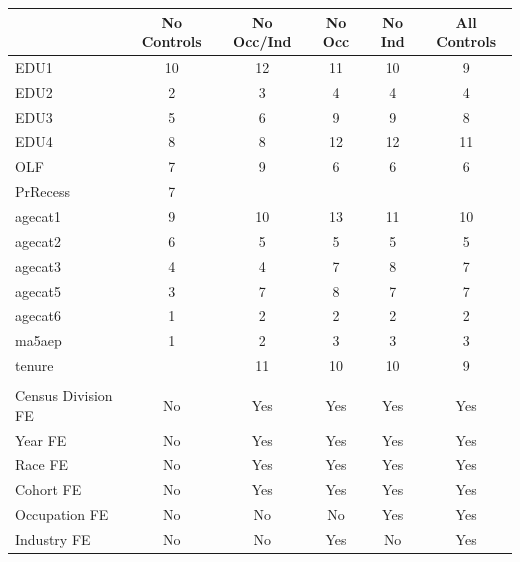 \begin{tabular}{lccccc}
\hline\hline
  & No Controls & No Occ/Ind & No Occ & No Ind & All Controls \\
\hline
EDU1&10&12&11&10&9\\
EDU2&2&3&4&4&4\\
EDU3&5&6&9&9&8\\
EDU4&8&8&12&12&11\\
OLF&7&9&6&6&6\\
PrRecess&7&&&&\\
agecat1&9&10&13&11&10\\
agecat2&6&5&5&5&5\\
agecat3&4&4&7&8&7\\
agecat5&3&7&8&7&7\\
agecat6&1&2&2&2&2\\
ma5aep&1&2&3&3&3\\
tenure&&11&10&10&9\\
\hline
\multicolumn{6}{l}{} \\
Census Division FE & No & Yes & Yes & Yes & Yes \\
Year FE & No & Yes & Yes & Yes & Yes \\
Race FE & No & Yes & Yes & Yes & Yes \\
Cohort FE & No & Yes & Yes & Yes & Yes \\
Occupation FE & No & No & No & Yes & Yes \\
Industry FE & No & No & Yes & No & Yes \\
\hline\hline
\end{tabular}
